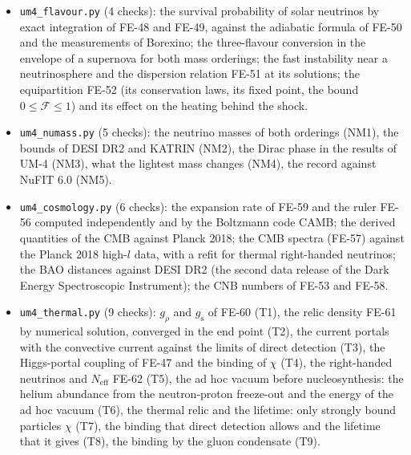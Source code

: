 \documentclass[
  10pt,
]{article}
\begin{document}
\begin{itemize}
  \texttt{um4\_neutrino.py} (5 checks): the flavour blindness of
  \(V_\Psi\) and the invariance of the mixing under \(v_{\mathrm{loc}}\)
  (N1), the resonance formulas FE-50 against an exact integration (N2),
  the crossing criterion of FE-51 (N3), the conservation laws of FE-52
  (N4), the CNB numbers of FE-53 (N5).
\item
  \texttt{um4\_flavour.py} (4 checks): the survival probability of solar
  neutrinos by exact integration of FE-48 and FE-49, against the
  adiabatic formula of FE-50 and the measurements of Borexino; the
  three-flavour conversion in the envelope of a supernova for both mass
  orderings; the fast instability near a neutrinosphere and the
  dispersion relation FE-51 at its solutions; the equipartition FE-52
  (its conservation laws, its fixed point, the bound
  \(0 \le \mathcal{F} \le 1\)) and its effect on the heating behind the
  shock.
\item
  \texttt{um4\_numass.py} (5 checks): the neutrino masses of both
  orderings (NM1), the bounds of DESI DR2 and KATRIN (NM2), the Dirac
  phase in the results of UM-4 (NM3), what the lightest mass changes
  (NM4), the record against NuFIT 6.0 (NM5).
\item
  \texttt{um4\_cosmology.py} (6 checks): the expansion rate of FE-59 and
  the ruler FE-56 computed independently and by the Boltzmann code CAMB;
  the derived quantities of the CMB against Planck 2018; the CMB spectra
  (FE-57) against the Planck 2018 high-\(l\) data, with a refit for
  thermal right-handed neutrinos; the BAO distances against DESI DR2
  (the second data release of the Dark Energy Spectroscopic Instrument);
  the CNB numbers of FE-53 and FE-58.
\item
  \texttt{um4\_thermal.py} (9 checks): \(g_\rho\) and \(g_{\mathrm{s}}\)
  of FE-60 (T1), the relic density FE-61 by numerical solution,
  converged in the end point (T2), the current portals with the
  convective current against the limits of direct detection (T3), the
  Higgs-portal coupling of FE-47 and the binding of \(\chi\) (T4), the
  right-handed neutrinos and \(N_{\mathrm{eff}}\) FE-62 (T5), the ad hoc
  vacuum before nucleosynthesis: the helium abundance from the
  neutron-proton freeze-out and the energy of the ad hoc vacuum (T6),
  the thermal relic and the lifetime: only strongly bound particles
  \(\chi\) (T7), the binding that direct detection allows and the
  lifetime that it gives (T8), the binding by the gluon condensate (T9).
\end{itemize}
\end{document}
